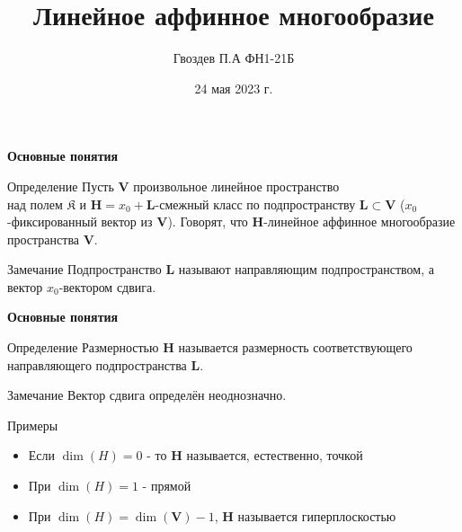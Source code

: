 \documentclass{beamer}
\title[Линейное аффинное многообразие]{\textbf{Линейное аффинное многообразие}}
\author{Гвоздев П.А ФН1-21Б}
\date{24 мая 2023 г.}
\begin{document}
\frame{\titlepage}


\begin{frame}{\textbf{Основные понятия}}

\begin{block}{Определение}
Пусть $\mathbf{V}$ произвольное линейное пространство\\
над полем $\mathfrak{K}$ и $\mathbf{H}=x_0+\mathbf{L}$-смежный класс по подпространству $\mathbf{L}\subset \mathbf{V}$ ($x_0$-фиксированный  вектор из $\mathbf{V}$). Говорят, что $\mathbf{H}$-линейное аффинное многообразие пространства $\mathbf{V}$.
\end{block}

\begin{block}{Замечание}
Подпространство $\mathbf{L}$ называют направляющим подпространством,
а вектор $x_0$-вектором сдвига.
\end{block}


\end{frame}


\begin{frame}{\textbf{Основные понятия}}

\begin{block}{Определение}
Размерностью $\mathbf{H}$ называется размерность соответствующего направляющего подпространства $\mathbf{L}$.
\end{block}
\begin{block}{Замечание}
Вектор сдвига определён неоднозначно.
\end{block}
\begin{block}{Примеры}

\begin{itemize}
\item Если $\dim(H)=0$ - то $\mathbf{H}$ называется, естественно, точкой 
\item При $\dim(H)=1$ - прямой
\item При $\dim(H)=\dim(\mathbf{V})-1$, $\mathbf{H}$ называется гиперплоскостью
\end{itemize}
 
\end{block}

\end{frame}
\end{document}
